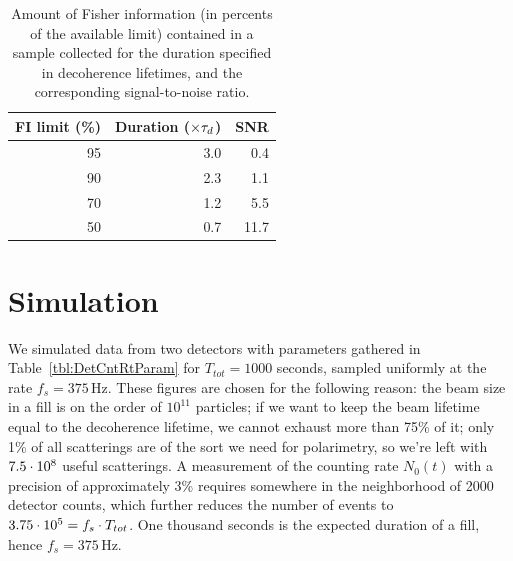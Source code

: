 \documentclass{jacow}
\begin{document}
\begin{table}[h]
	\caption{Amount of Fisher information (in percents of the available limit) contained in a sample collected for the duration specified in decoherence lifetimes, and the corresponding signal-to-noise ratio.\label{tbl:FItot}}
	
	\centering
	\begin{tabular}{rrr}
		\hline
		FI limit (\%) & Duration ($\times\tau_d$) & SNR  \\
		\hline
		95            & 3.0                     & 0.4         \\
		90            & 2.3                     & 1.1         \\
		70            & 1.2                     & 5.5         \\
		50            & 0.7                     & 11.7        \\
		\hline
	\end{tabular}
\end{table}

\section{Simulation}
We simulated data from two detectors with parameters gathered in Table~\ref{tbl:DetCntRtParam} for $T_{tot}=1000$ seconds, sampled uniformly at the rate $f_s = 375$\,Hz. These figures are chosen for the following reason: the beam size in a fill is on the order of $10^{11}$ particles; if we want to keep the beam lifetime equal to the decoherence lifetime, we cannot exhaust more than 75\% of it; only 1\% of all scatterings are of the sort we need for polarimetry, so we're left with ${7.5}\cdot 10^{8}$ useful scatterings. A measurement of the counting rate $N_0(t)$ with a precision of approximately 3\% requires somewhere in the neighborhood of 2000 detector counts, which further reduces the number of events to ${3.75}\cdot 10^{5}= f_s\cdot T_{tot}$. One thousand seconds is the expected duration of a fill, hence $f_s = 375$\,Hz. 
\end{document}
